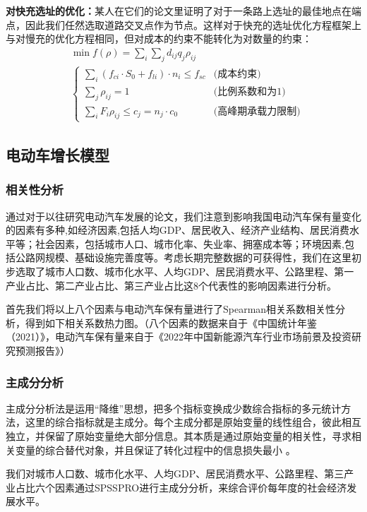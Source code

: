 \documentclass[12pt, a4paper, oneside]{ctexart}
\begin{document}
\textbf{对快充选址的优化：}某人在它们的论文里证明了对于一条路上选址的最佳地点在端点，因此我们任然选取道路交叉点作为节点。这样对于快充的选址优化方程框架上与对慢充的优化方程相同，但对成本的约束不能转化为对数量的约束：
\begin{align*}
    & \min  f(\rho)=\sum_i \sum_jd_{ij} q_j \rho_{ij} \\
    & \begin{cases}
        \sum\limits_{i}(f_{ci}\cdot S_0+f_{li})\cdot n_i\leqslant f_{sc}                                    & \text{(成本约束)} \\
       \sum\limits_j \rho_{ij}=1                               & \text{(比例系数和为1)} \\
       \sum\limits_i F_{i}\rho_{ij}\leqslant c_j=n_j \cdot c_0 & \text{(高峰期承载力限制)}
   \end{cases}
\end{align*}
\subsection{电动车增长模型}
\subsubsection{相关性分析}
通过对于以往研究电动汽车发展的论文，我们注意到影响我国电动汽车保有量变化的因素有多种,如经济因素,包括人均GDP、居民收入、经济产业结构、居民消费水平等；社会因素，包括城市人口、城市化率、失业率、拥塞成本等；环境因素,包括公路网规模、基础设施完善度等。考虑长期完整数据的可获得性，我们在这里初步选取了城市人口数、城市化水平、人均GDP、居民消费水平、公路里程、第一产业占比、第二产业占比、第三产业占比这8个代表性的影响因素进行分析。

首先我们将以上八个因素与电动汽车保有量进行了Spearman相关系数相关性分析，得到如下相关系数热力图。（八个因素的数据来自于《中国统计年鉴（2021）》\cite{cite:统计年鉴}，电动汽车保有量来自于《2022年中国新能源汽车行业市场前景及投资研究预测报告》\cite{cite:预测报告}）
\subsubsection{主成分分析}
主成分分析法是运用“降维”思想，把多个指标变换成少数综合指标的多元统计方法，这里的综合指标就是主成分。每个主成分都是原始变量的线性组合，彼此相互独立，并保留了原始变量绝大部分信息。其本质是通过原始变量的相关性，寻求相关变量的综合替代对象，并且保证了转化过程中的信息损失最小 。

我们对城市人口数、城市化水平、人均GDP、居民消费水平、公路里程、第三产业占比六个因素通过SPSSPRO进行主成分分析，来综合评价每年度的社会经济发展水平。
\end{document}
